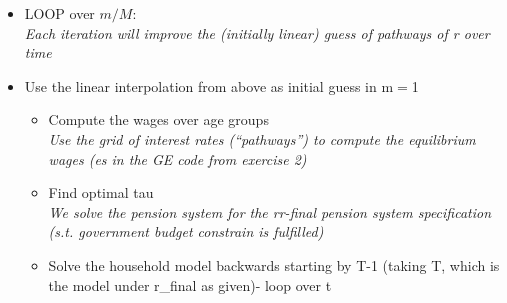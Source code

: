 \documentclass[12pt,a4paper]{article}
\begin{document}
\begin{itemize}
\item	LOOP over $m/M$: \\
\textit{Each iteration will improve the (initially linear) guess of pathways of r over time}
\item Use the linear interpolation from above as initial guess in m$=$1

\begin{itemize}
    \item Compute the wages over age groups \\
\textit{Use the grid of interest rates (“pathways”) to compute the equilibrium wages (es in the GE code from exercise 2)}

\item Find optimal tau\\
\textit{We solve the pension system for the rr-final pension system specification (s.t. government budget constrain is fulfilled)}

\item Solve the household model backwards starting by T-1 (taking T, which is the model under r\_final as given)- loop over t


\end{itemize}
\end{itemize}
\end{document}

